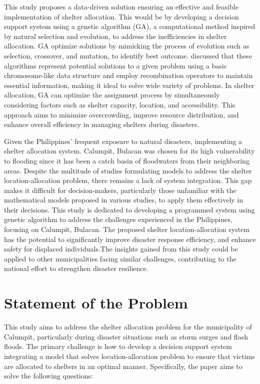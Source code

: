 	This study proposes a data-driven solution ensuring an effective and feasible implementation of shelter allocation. This would be by developing a decision support system using a genetic algorithm (GA), a computational method inspired by natural selection and evolution, to address the inefficiencies in shelter allocation. GA optimize solutions by mimicking the process of evolution such as selection, crossover, and mutation, to identify best outcome. \textcite{Mathew2012} discussed that these algorithms represent potential solutions to a given problem using a basic chromosome-like data structure and employ recombination operators to maintain essential information, making it ideal to solve wide variety of problems. In shelter allocation, GA can optimize the assignment process by simultaneously considering factors such as shelter capacity, location, and accessibility. This approach aims to minimize overcrowding, improve resource distribution, and enhance overall efficiency in managing shelters during disasters.
		
	Given the Philippines' frequent exposure to natural disasters, implementing a shelter allocation system. Calumpit, Bulacan was chosen for its high vulnerability to flooding since it has been a catch basin of floodwaters from their neighboring areas. Despite the multitude of studies formulating models to address the shelter location-allocation problem, there remains a lack of system integration. This gap makes it difficult for decision-makers, particularly those unfamiliar with the mathematical models proposed in various studies, to apply them effectively in their decisions. This study is dedicated to developing a programmed system using genetic algorithm to address the challenges experienced in the Philippines, focusing on Calumpit, Bulacan. The proposed shelter location-allocation system has the potential to significantly improve disaster response efficiency, and enhance safety for displaced individuals.The insights gained from this study could be applied to other municipalities facing similar challenges, contributing to the national effort to strengthen disaster resilience. 

\section{Statement of the Problem}
	This study aims to address the shelter allocation problem for the municipality of Calumpit, particularly during disaster situations such as storm surges and flash floods. The primary challenge is how to develop a decision support system integrating a model that solves location-allocation problem to ensure that victims are allocated to shelters in an optimal manner. Specifically, the paper aims to solve the following questions:
	
